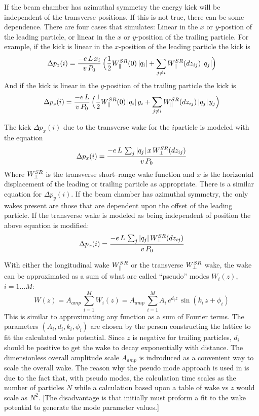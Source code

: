 If the beam chamber has azimuthal symmetry the energy kick will be independent of the transverse
positions. If this is not true, there can be some dependence. There are four cases that \bmad
simulates: Linear in the $x$ or $y$-postion of the leading particle, or linear in the $x$ or
$y$-position of the trailing particle. For example, if the kick is linear in the $x$-position of the
leading particle the kick is
\begin{equation}
  \Delta p_z(i) = \frac{-e \, L \, x_i}{v \, P_0} \, \Bigl( \frac{1}{2}W^{SR}_\parallel(0) \,  |q_i| +
        \sum_{j \ne i} W^{SR}_\parallel(dz_{ij}) \, |q_j| \Bigr)
  \label{delvp2}
\end{equation}
And if the kick is linear in the $y$-position of the trailing particle the kick is
\begin{equation}
  \Delta p_z(i) = \frac{-e \, L}{v \, P_0} \, \Bigl( \frac{1}{2}W^{SR}_\parallel(0) \,  |q_i| \, y_i +
        \sum_{j \ne i} W^{SR}_\parallel(dz_{ij}) \, |q_j| \, y_j \Bigr)
  \label{delvp3}
\end{equation}

The kick $\Delta p_x(i)$ due to the transverse wake for the $i$\Th particle is modeled with the
equation
\begin{equation}
  \Delta p_x(i) = \frac{-e \, L \, \sum_j |q_j| \, x \, W^{SR}_\perp(dz_{ij})}{v \, P_0}
  \label{pelqxw1}
\end{equation}
Where $W^{SR}_\perp$ is the transverse short--range wake function and $x$ is the horizontal displacement of
the leading or trailing particle as appropriate. There is a similar equation for $\Delta p_y(i)$.
If the beam chamber has azimuthal symmetry, the only wakes present are those that are dependent upon
the offset of the leading particle. If the transverse wake is modeled as being independent of
position the above equation is modified:
\begin{equation}
  \Delta p_x(i) = \frac{-e \, L \, \sum_j |q_j| \, W^{SR}_\perp(dz_{ij})}{v \, P_0}
  \label{pelqxw2}
\end{equation}


With either the longitudinal wake $W^{SR}_\parallel$ or the transverse $W^{SR}_\perp$ wake, the wake can be
approximated as a sum of what are called ``pseudo'' modes $W_i(z)$, $i = 1 \ldots M$:
\begin{equation}
  W(z) = A_{amp} \, \sum_{i = 1}^M W_i(z)
  = A_{amp} \, \sum_{i = 1}^M A_i \, e^{d_i z} \, \sin (k_i \, z + \phi_i)
  \label{wadzk}
\end{equation}
This is similar to approximating any function as a sum of Fourier terms. The parameters $(A_i, d_i,
k_i, \phi_i)$ are chosen by the person constructing the lattice to fit the calculated wake
potential. Since $z$ is negative for trailing particles, $d_i$ should be positive to get the wake to
decay exponentially with distance. The dimensionless overall amplitude scale $A_{amp}$ is indroduced
as a convenient way to scale the overall wake. The reason why the pseudo mode approach is used in \bmad is
due to the fact that, with pseudo modes, the calculation time scales as the number of particles $N$
while a calculation based upon a table of wake vs $z$ would scale as $N^2$. [The disadvantage is
that initially must proform a fit to the wake potential to generate the mode parameter
values.]

